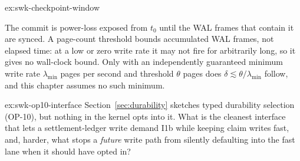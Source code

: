 \documentclass[11pt,a4paper]{article}
\theoremstyle{definition}
\theoremstyle{remark}
\begin{document}
\begin{pdsolution}{ex:swk-checkpoint-window}
\par\smallskip
\begin{center}
%
\end{center}
\par\smallskip
The commit is power-loss exposed from $t_0$ until the WAL frames that contain it are synced. A page-count threshold bounds accumulated WAL frames, not elapsed time: at a low or zero write rate it may not fire for arbitrarily long, so it gives no wall-clock bound. Only with an independently guaranteed minimum write rate $\lambda_{\min}$ pages per second and threshold $\theta$ pages does $\delta \lesssim \theta/\lambda_{\min}$ follow, and this chapter assumes no such minimum.
\end{pdsolution}
\begin{pdexercise}[kind=Open,rating=3]{ex:swk-op10-interface}
Section~\ref{sec:durability} sketches typed durability selection (OP-10), but nothing in the kernel opts into it. What is the cleanest interface that lets a settlement-ledger write demand I1b while keeping claim writes fast, and, harder, what stops a \emph{future} write path from silently defaulting into the fast lane when it should have opted in?
\end{pdexercise}
\end{document}
